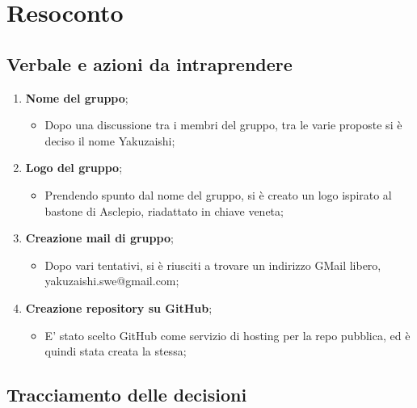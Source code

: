 \section{Resoconto}
\subsection{Verbale e azioni da intraprendere}

\begin{enumerate}
	\item \textbf{Nome del gruppo};
	\begin{itemize}
		\item Dopo una discussione tra i membri del gruppo, tra le varie proposte si è deciso il nome Yakuzaishi;
	\end{itemize}
	\item \textbf{Logo del gruppo};
	\begin{itemize}
		\item Prendendo spunto dal nome del gruppo, si è creato un logo ispirato al bastone di Asclepio, riadattato in chiave veneta;
	\end{itemize}
	\item \textbf{Creazione mail di gruppo};
	\begin{itemize}
		\item Dopo vari tentativi, si è riusciti a trovare un indirizzo GMail\glo{} libero, yakuzaishi.swe@gmail.com;
	\end{itemize}
	\item \textbf{Creazione repository su GitHub};
	\begin{itemize}
		\item E' stato scelto GitHub\glo{} come servizio di hosting per la repo pubblica, ed è quindi stata creata la stessa;
	\end{itemize}

\end{enumerate}

\pagebreak

\subsection{Tracciamento delle decisioni}

